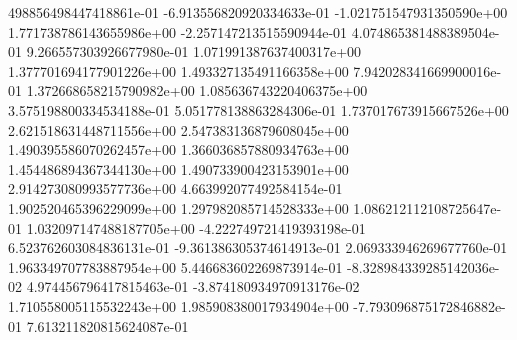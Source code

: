 498856498447418861e-01	-6.913556820920334633e-01	-1.021751547931350590e+00	1.771738786143655986e+00	-2.257147213515590944e-01	4.074865381488389504e-01	9.266557303926677980e-01	1.071991387637400317e+00	1.377701694177901226e+00	1.493327135491166358e+00	7.942028341669900016e-01	1.372668658215790982e+00	1.085636743220406375e+00	3.575198800334534188e-01	5.051778138863284306e-01	1.737017673915667526e+00	2.621518631448711556e+00	2.547383136879608045e+00	1.490395586070262457e+00	1.366036857880934763e+00	1.454486894367344130e+00	1.490733900423153901e+00	2.914273080993577736e+00	4.663992077492584154e-01	1.902520465396229099e+00	1.297982085714528333e+00	1.086212112108725647e-01	1.032097147488187705e+00	-4.222749721419393198e-01	6.523762603084836131e-01	-9.361386305374614913e-01	2.069333946269677760e-01	1.963349707783887954e+00	5.446683602269873914e-01	-8.328984339285142036e-02	4.974456796417815463e-01	-3.874180934970913176e-02	1.710558005115532243e+00	1.985908380017934904e+00	-7.793096875172846882e-01	7.613211820815624087e-01
